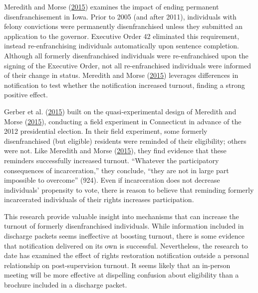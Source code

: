\documentclass[
  12pt,
]{article}
\begin{document}
Meredith and Morse (\protect\hyperlink{ref-Meredith2015}{2015}) examines the impact of ending permanent disenfranchisement in Iowa. Prior to 2005 (and after 2011), individuals with felony convictions were permanently disenfranchised unless they submitted an application to the governor. Executive Order 42 eliminated this requirement, instead re-enfranchising individuals automatically upon sentence completion. Although all formerly disenfranchised individuals were re-enfranchised upon the signing of the Executive Order, not all re-enfranchised individuals were informed of their change in status. Meredith and Morse (\protect\hyperlink{ref-Meredith2015}{2015}) leverages differences in notification to test whether the notification increased turnout, finding a strong positive effect.

Gerber et al. (\protect\hyperlink{ref-Gerber2015}{2015}) built on the quasi-experimental design of Meredith and Morse (\protect\hyperlink{ref-Meredith2015}{2015}), conducting a field experiment in Connecticut in advance of the 2012 presidential election. In their field experiment, some formerly disenfranchised (but eligible) residents were reminded of their eligibility; others were not. Like Meredith and Morse (\protect\hyperlink{ref-Meredith2015}{2015}), they find evidence that these reminders successfully increased turnout. ``Whatever the participatory consequences of incarceration,'' they conclude, ``they are not in large part impossible to overcome'' (924). Even if incarceration does not decrease individuals' propensity to vote, there is reason to believe that reminding formerly incarcerated individuals of their rights increases participation.

This research provide valuable insight into mechanisms that can increase the turnout of formerly disenfranchised individuals. While information included in discharge packets seems ineffective at boosting turnout, there is some evidence that notification delivered on its own is successful. Nevertheless, the research to date has examined the effect of rights restoration notification outside a personal relationship on post-supervision turnout. It seems likely that an in-person meeting will be more effective at dispelling confusion about eligibility than a brochure included in a discharge packet.
\end{document}
